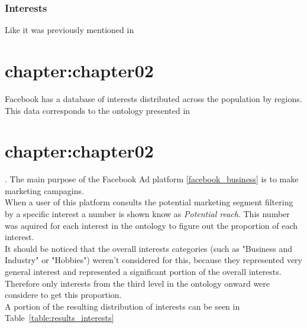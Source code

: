 \subsection{Interests} 

Like it was previously mentioned in \chapter{chapter:chapter02} Facebook has a database of interests distributed across the population by regions. This data corresponds to the ontology presented in \chapter{chapter:chapter02}. The main purpose of the Facebook Ad platform \ref{facebook_business} is to make marketing campagins.\\

When a user of this platform consults the potential marketing segment filtering by a specific interest a number is shown know as \textit{Potential reach}. This number was aquired for each interest in the ontology to figure out the proportion of each interest.\\

It should be noticed that the overall interests categories (such as "Business and Industry" or "Hobbies") weren't considered for this, because they represented very general interest and represented a significant portion of the overall interests. Therefore only interests from the third level in the ontology onward were considere to get this proportion.\\

A portion of the resulting distribution of interests can be seen in Table~\ref{table:results_interests}

